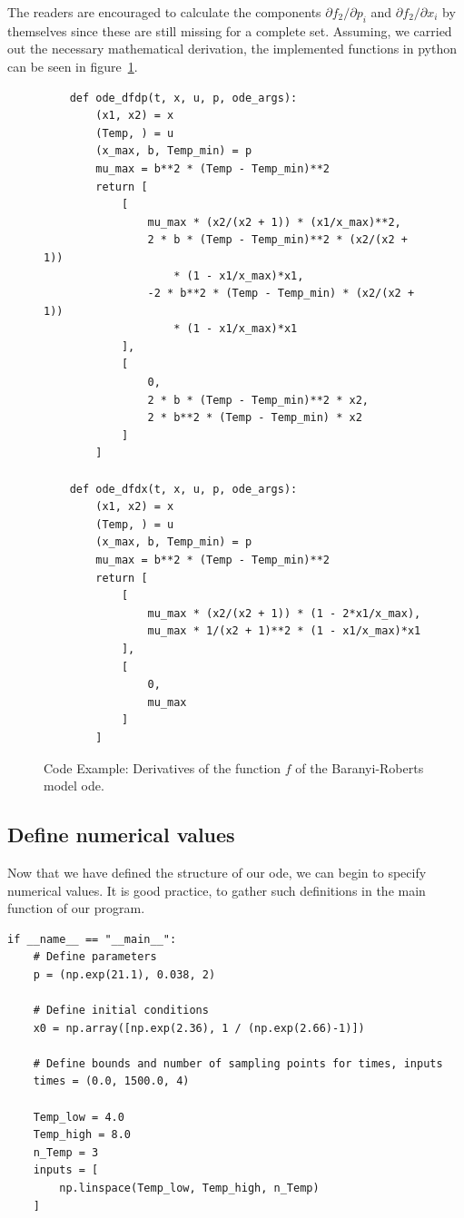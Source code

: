 \documentclass[10pt,A4paper]{article}
\begin{document}
The readers are encouraged to calculate the components $\partial f_2/\partial p_i$ and $\partial f_2/\partial x_i$ by themselves since these are still missing for a complete set.
Assuming, we carried out the necessary mathematical derivation, the implemented functions in python can be seen in figure~\ref{fig:code_baranyi_roberts_ode_fun_derivatives}.
\begin{figure}[H]
    \begin{verbatim}
    def ode_dfdp(t, x, u, p, ode_args):
        (x1, x2) = x
        (Temp, ) = u
        (x_max, b, Temp_min) = p
        mu_max = b**2 * (Temp - Temp_min)**2
        return [
            [
                mu_max * (x2/(x2 + 1)) * (x1/x_max)**2,
                2 * b * (Temp - Temp_min)**2 * (x2/(x2 + 1))
                    * (1 - x1/x_max)*x1,
                -2 * b**2 * (Temp - Temp_min) * (x2/(x2 + 1))
                    * (1 - x1/x_max)*x1
            ],
            [
                0,
                2 * b * (Temp - Temp_min)**2 * x2,
                2 * b**2 * (Temp - Temp_min) * x2
            ] 
        ]

    def ode_dfdx(t, x, u, p, ode_args):
        (x1, x2) = x
        (Temp, ) = u
        (x_max, b, Temp_min) = p
        mu_max = b**2 * (Temp - Temp_min)**2
        return [
            [
                mu_max * (x2/(x2 + 1)) * (1 - 2*x1/x_max),
                mu_max * 1/(x2 + 1)**2 * (1 - x1/x_max)*x1
            ], 
            [
                0,
                mu_max
            ]
        ]
    \end{verbatim}
    \caption{Code Example: Derivatives of the function $f$ of the Baranyi-Roberts model \ac{ode}.}
    \label{fig:code_baranyi_roberts_ode_fun_derivatives}
\end{figure}
%
\subsection*{Define numerical values}
Now that we have defined the structure of our \ac{ode}, we can begin to specify numerical values.
It is good practice, to gather such definitions in the main function of our program.
\begin{verbatim}
if __name__ == "__main__":
    # Define parameters
    p = (np.exp(21.1), 0.038, 2)

    # Define initial conditions
    x0 = np.array([np.exp(2.36), 1 / (np.exp(2.66)-1)])

    # Define bounds and number of sampling points for times, inputs
    times = (0.0, 1500.0, 4)

    Temp_low = 4.0
    Temp_high = 8.0
    n_Temp = 3
    inputs = [
        np.linspace(Temp_low, Temp_high, n_Temp)
    ]
\end{verbatim}
\end{document}
